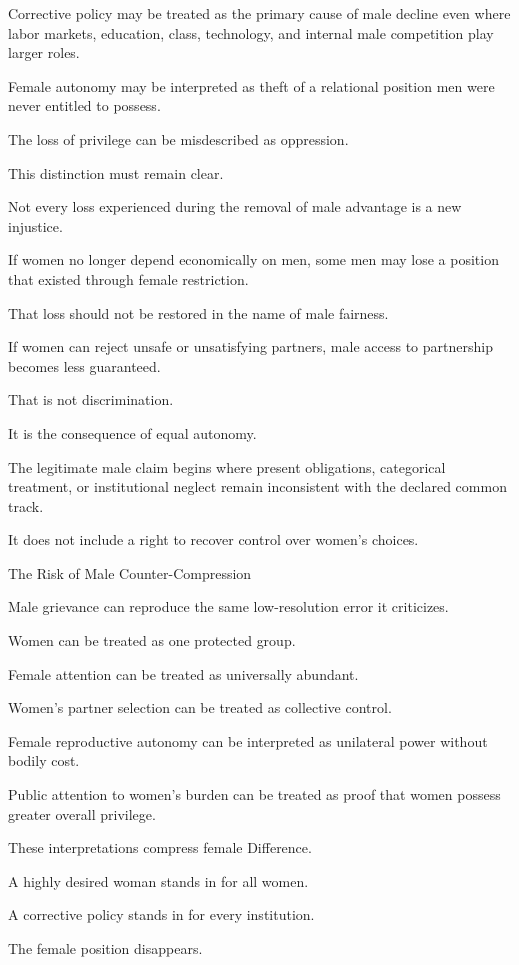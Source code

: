 Corrective policy may be treated as the primary cause of male decline even where labor markets, education, class, technology, and internal male competition play larger roles.

Female autonomy may be interpreted as theft of a relational position men were never entitled to possess.

The loss of privilege can be misdescribed as oppression.

This distinction must remain clear.

Not every loss experienced during the removal of male advantage is a new injustice.

If women no longer depend economically on men, some men may lose a position that existed through female restriction.

That loss should not be restored in the name of male fairness.

If women can reject unsafe or unsatisfying partners, male access to partnership becomes less guaranteed.

That is not discrimination.

It is the consequence of equal autonomy.

The legitimate male claim begins where present obligations, categorical treatment, or institutional neglect remain inconsistent with the declared common track.

It does not include a right to recover control over women’s choices.

The Risk of Male Counter-Compression

Male grievance can reproduce the same low-resolution error it criticizes.

Women can be treated as one protected group.

Female attention can be treated as universally abundant.

Women’s partner selection can be treated as collective control.

Female reproductive autonomy can be interpreted as unilateral power without bodily cost.

Public attention to women’s burden can be treated as proof that women possess greater overall privilege.

These interpretations compress female Difference.

A highly desired woman stands in for all women.

A corrective policy stands in for every institution.

The female position disappears.

